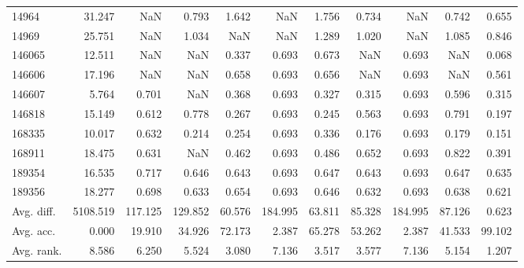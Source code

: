\begin{tabular}{lrrrrrrrrrr}
14964 & 31.247 & NaN & 0.793 & 1.642 & NaN & 1.756 & 0.734 & NaN & 0.742 & 0.655 \\
14969 & 25.751 & NaN & 1.034 & NaN & NaN & 1.289 & 1.020 & NaN & 1.085 & 0.846 \\
146065 & 12.511 & NaN & NaN & 0.337 & 0.693 & 0.673 & NaN & 0.693 & NaN & 0.068 \\
146606 & 17.196 & NaN & NaN & 0.658 & 0.693 & 0.656 & NaN & 0.693 & NaN & 0.561 \\
146607 & 5.764 & 0.701 & NaN & 0.368 & 0.693 & 0.327 & 0.315 & 0.693 & 0.596 & 0.315 \\
146818 & 15.149 & 0.612 & 0.778 & 0.267 & 0.693 & 0.245 & 0.563 & 0.693 & 0.791 & 0.197 \\
168335 & 10.017 & 0.632 & 0.214 & 0.254 & 0.693 & 0.336 & 0.176 & 0.693 & 0.179 & 0.151 \\
168911 & 18.475 & 0.631 & NaN & 0.462 & 0.693 & 0.486 & 0.652 & 0.693 & 0.822 & 0.391 \\
189354 & 16.535 & 0.717 & 0.646 & 0.643 & 0.693 & 0.647 & 0.643 & 0.693 & 0.647 & 0.635 \\
189356 & 18.277 & 0.698 & 0.633 & 0.654 & 0.693 & 0.646 & 0.632 & 0.693 & 0.638 & 0.621 \\
Avg. diff. & 5108.519 & 117.125 & 129.852 & 60.576 & 184.995 & 63.811 & 85.328 & 184.995 & 87.126 & 0.623 \\
Avg. acc. & 0.000 & 19.910 & 34.926 & 72.173 & 2.387 & 65.278 & 53.262 & 2.387 & 41.533 & 99.102 \\
Avg. rank. & 8.586 & 6.250 & 5.524 & 3.080 & 7.136 & 3.517 & 3.577 & 7.136 & 5.154 & 1.207 \\
\bottomrule
\end{tabular}
